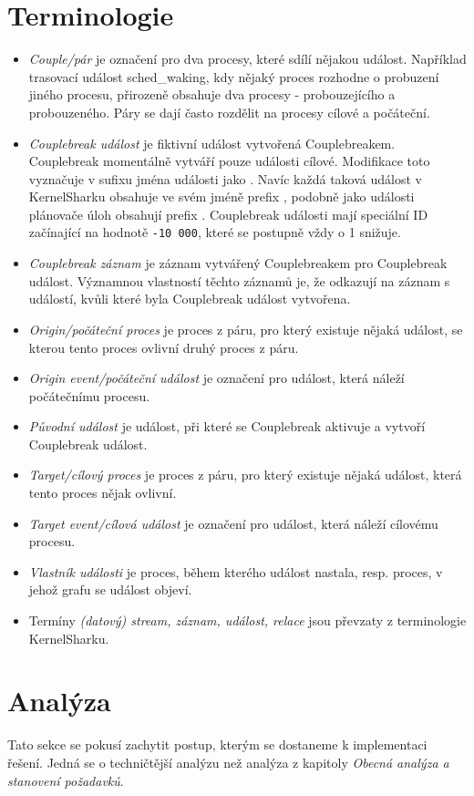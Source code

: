 \section{Terminologie}
\begin{itemize}
    \item \emph{Couple/pár} je označení pro dva procesy, které sdílí nějakou událost. Například trasovací událost sched\_waking, kdy nějaký proces rozhodne o probuzení jiného procesu, přirozeně obsahuje dva procesy - probouzejícího a probouzeného. Páry se dají často rozdělit na procesy cílové a počáteční.
    \item \emph{Couplebreak událost} je fiktivní událost vytvořená Couplebreakem. Couplebreak momentálně vytváří pouze události cílové. Modifikace toto vyznačuje v sufixu jména události jako \uv{[target]}. Navíc každá taková událost v KernelSharku obsahuje ve svém jméně prefix , podobně jako události plánovače úloh obsahují prefix . Couplebreak události mají speciální ID začínající na hodnotě \texttt{-10 000}, které se postupně vždy o 1 snižuje.
    \item \emph{Couplebreak záznam} je záznam vytvářený Couplebreakem pro Couplebreak událost. Významnou vlastností těchto záznamů je, že odkazují na záznam s událostí, kvůli které byla Couplebreak událost vytvořena.
    \item \emph{Origin/počáteční proces} je proces z páru, pro který existuje nějaká událost, se kterou tento proces ovlivní druhý proces z páru.
    \item \emph{Origin event/počáteční událost} je označení pro událost, která náleží počátečnímu procesu.
    \item \emph{Původní událost} je událost, při které se Couplebreak aktivuje a vytvoří Couplebreak událost.
    \item \emph{Target/cílový proces} je proces z páru, pro který existuje nějaká událost, která tento proces nějak ovlivní. 
    \item \emph{Target event/cílová událost} je označení pro událost, která náleží cílovému procesu.
    \item \emph{Vlastník události} je proces, během kterého událost nastala, resp. proces, v jehož grafu se událost objeví.
    \item Termíny \emph{(datový) stream, záznam, událost, relace} jsou převzaty z terminologie KernelSharku.
\end{itemize}

\section{Analýza}
Tato sekce se pokusí zachytit postup, kterým se dostaneme k implementaci řešení. Jedná se o techničtější analýzu než analýza z kapitoly \emph{Obecná analýza a stanovení požadavků}.

